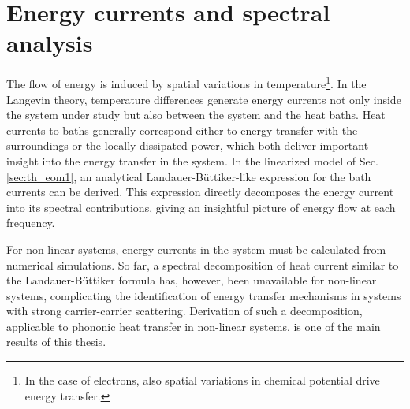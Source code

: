 \section{Energy currents and spectral analysis}
\label{sec:th_currents}

The flow of energy is  induced by spatial variations in temperature\footnote{In the case of electrons, also spatial variations in chemical potential drive energy transfer.}. In the Langevin theory, temperature differences generate energy currents not only inside the system under study but also between the system and the heat baths. Heat currents to baths generally correspond either to energy transfer with the surroundings or the locally dissipated power, which both deliver important insight into the energy transfer in the system. In the linearized model of Sec. \ref{sec:th_eom1}, an analytical Landauer-B\"uttiker-like expression for the bath currents can be derived. This expression directly decomposes the energy current into its spectral contributions, giving an insightful picture of energy flow at each frequency.

For non-linear systems, energy currents in the system must be calculated from numerical simulations. So far, a spectral decomposition of heat current similar to the Landauer-B\"uttiker formula has, however, been unavailable for non-linear systems, complicating the identification of energy transfer mechanisms in systems with strong carrier-carrier scattering. Derivation of such a decomposition, applicable to phononic heat transfer in non-linear systems, is one of the main results of this thesis.

